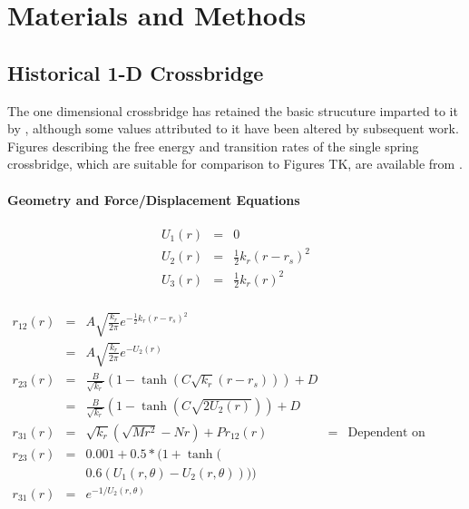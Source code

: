 \documentclass[]{article}
\begin{document}
\section*{Materials and Methods}


\subsection*{Historical 1-D Crossbridge}

The one dimensional crossbridge has retained the basic strucuture imparted to it by \citet{Huxley1957e}, although some values attributed to it have been altered by subsequent work. \citep{Daniel1998a,Chase2004a,Tanner2007a}
Figures describing the free energy and transition rates of the single spring crossbridge, which are suitable for comparison to Figures TK, are available from \citet{Tanner2007a}.

\paragraph*{Geometry and Force/Displacement Equations}


\begin{eqnarray}
\label{1sEnergy}
    U_1(r) & = & 0 \nonumber \\
    U_2(r) & = & \frac{1}{2}k_r (r-r_s)^2 \nonumber \\
    U_3(r) & = & \frac{1}{2}k_r (r)^2 \\
\end{eqnarray}


\begin{eqnarray}  
\label{1sTransRates}
	r_{12}(r)   & = & A \sqrt{\frac{k_r}{2 \pi}} e^{-\frac{1}{2} k_r (r-r_s)^2} \nonumber \\
	            & = & A \sqrt{\frac{k_r}{2 \pi}} e^{-U_2(r)} \nonumber \\
    r_{23}(r)   & = & \frac{B}{\sqrt{k_r}} (1 - \tanh(C \sqrt{k_r} (r-r_s))) + D \\
                & = & \frac{B}{\sqrt{k_r}} (1 - \tanh(C \sqrt{2 U_2(r)})) + D \\
	r_{31}(r)   & = & \sqrt{k_r} (\sqrt{M r^2} - N r) + P

	r_{12}(r)   & = & \text{Dependent on diffusion} \nonumber \\
    r_{23}(r)   & = & 0.001 + 0.5 * (1 + \tanh( \nonumber \\
                        &   & 0.6 (U_1(r, \theta) - U_2(r, \theta)))) \\
	r_{31}(r)   & = & e^{-1 / U_2(r, \theta)}
\end{eqnarray} 
 
\end{document}
